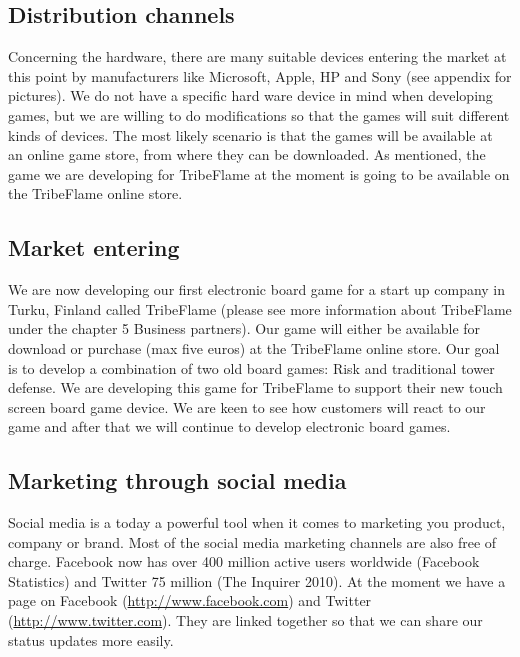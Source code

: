 \documentclass[12pt,a4paper]{article}
\begin{document}
\subsection{Distribution channels}
Concerning the hardware, there are many suitable devices entering the market at this point by manufacturers like Microsoft, Apple, HP and Sony (see appendix for pictures). We do not have a specific hard ware device in mind when developing games, but we are willing to do modifications so that the games will suit different kinds of devices. The most likely scenario is that the games will be available at an online game store, from where they can be downloaded. As mentioned, the game we are developing for TribeFlame at the moment is going to be available on the TribeFlame online store.

\subsection{Market entering}
We are now developing our first electronic board game for a start up company in Turku, Finland called TribeFlame (please see more information about TribeFlame under the chapter 5 Business partners). Our game will either be available for download or purchase (max five euros) at the TribeFlame online store. Our goal is to develop a combination of two old board games: Risk and traditional tower defense. We are developing this game for TribeFlame to support their new touch screen board game device. We are keen to see how customers will react to our game and after that we will continue to develop electronic board games.

\subsection{Marketing through social media}
Social media is a today a powerful tool when it comes to marketing you product, company or brand. Most of the social media marketing channels are also free of charge. Facebook now has over 400 million active users worldwide (Facebook Statistics) and Twitter 75 million (The Inquirer 2010). At the moment we have a page on Facebook (\url{http://www.facebook.com}) and Twitter (\url{http://www.twitter.com}). They are linked together so that we can share our status updates more easily.
\end{document}
